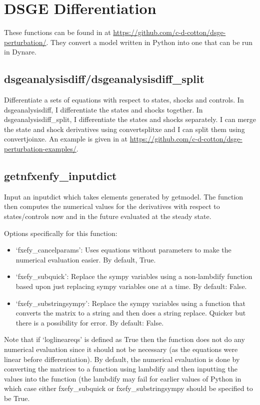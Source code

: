 \documentclass{article}
\theoremstyle{definition}
\begin{document}
\section{DSGE Differentiation}
These functions can be found in  at \url{https://github.com/c-d-cotton/dsge-perturbation/}. They convert a model written in Python into one that can be run in Dynare.

\subsection{dsgeanalysisdiff/dsgeanalysisdiff\_split}
Differentiate a sets of equations with respect to states, shocks and controls. In dsgeanalysisdiff, I differentiate the states and shocks together. In dsgeanalysisdiff\_split, I differentiate the states and shocks separately. I can merge the state and shock derivatives using convertsplitxe and I can split them using convertjoinxe. An example is given in  at \url{https://github.com/c-d-cotton/dsge-perturbation-examples/}.

\subsection{getnfxenfy\_inputdict}
Input an inputdict which takes elements generated by getmodel. The function then computes the numerical values for the derivatives with respect to states/controls now and in the future evaluated at the steady state.

Options specifically for this function:
\begin{itemize}
    \item `fxefy\_cancelparams': Uses equations without parameters to make the numerical evaluation easier. By default, True.
    \item `fxefy\_subquick': Replace the sympy variables using a non-lambdify function based upon just replacing sympy variables one at a time. By default: False.
    \item `fxefy\_substringsympy': Replace the sympy variables using a function that converts the matrix to a string and then does a string replace. Quicker but there is a possibility for error. By default: False.
\end{itemize}

Note that if `loglineareqs' is defined as True then the function does not do any numerical evaluation since it should not be necessary (as the equations were linear before differentiation). By default, the numerical evaluation is done by converting the matrices to a function using lambdify and then inputting the values into the function (the lambdify may fail for earlier values of Python in which case either fxefy\_subquick or fxefy\_substringsympy should be specified to be True.
\end{document}
